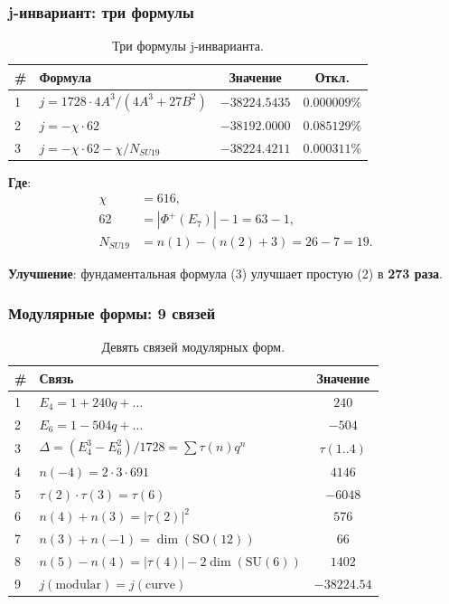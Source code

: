 \documentclass[11pt,a4paper]{article}
\newcommand{\SU}{\ensuremath{\mathrm{SU}}}
\newcommand{\SO}{\ensuremath{\mathrm{SO}}}
\theoremstyle{definition}
\begin{document}
\subsubsection{j-инвариант: три формулы}

\begin{table}[ht]
\centering
\caption{Три формулы j-инварианта.}
\label{tab:app-j-invariant}
\begin{tabular}{llcc}
\toprule
\# & Формула & Значение & Откл. \\
\midrule
1 & $j = 1728 \cdot 4A^3/(4A^3 + 27B^2)$ & $-38224.5435$ & $0.000009\%$ \\
2 & $j = -\chi \cdot 62$ & $-38192.0000$ & $0.085129\%$ \\
3 & $j = -\chi \cdot 62 - \chi/N_{SU19}$ & $-38224.4211$ & $\mathbf{0.000311\%}$ \\
\bottomrule
\end{tabular}
\end{table}

\noindent
\textbf{Где}:
\begin{align}
    \chi &= 616, \\
    62 &= |\Phi^+(E_7)| - 1 = 63 - 1, \\
    N_{SU19} &= n(1) - (n(2) + 3) = 26 - 7 = 19.
\end{align}

\noindent
\textbf{Улучшение}: фундаментальная формула (3) улучшает простую (2)
в \textbf{273 раза}.


\subsubsection{Модулярные формы: 9 связей}

\begin{table}[ht]
\centering
\caption{Девять связей модулярных форм.}
\label{tab:app-modular-9}
\begin{tabular}{llc}
\toprule
\# & Связь & Значение \\
\midrule
1 & $E_4 = 1 + 240 q + \ldots$ & $240$ \\
2 & $E_6 = 1 - 504 q + \ldots$ & $-504$ \\
3 & $\Delta = (E_4^3 - E_6^2)/1728 = \sum \tau(n) q^n$ & $\tau(1..4)$ \\
4 & $n(-4) = 2 \cdot 3 \cdot 691$ & $4146$ \\
5 & $\tau(2) \cdot \tau(3) = \tau(6)$ & $-6048$ \\
6 & $n(4) + n(3) = |\tau(2)|^2$ & $576$ \\
7 & $n(3) + n(-1) = \dim(\SO(12))$ & $66$ \\
8 & $n(5) - n(4) = |\tau(4)| - 2\dim(\SU(6))$ & $1402$ \\
9 & $j(\text{modular}) = j(\text{curve})$ & $-38224.54$ \\
\bottomrule
\end{tabular}
\end{table}
\end{document}
